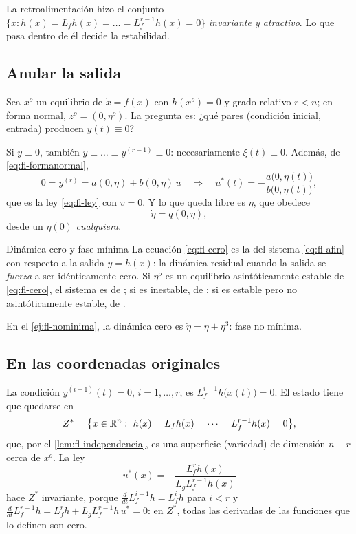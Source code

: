 
La retroalimentación hizo el conjunto $\{x:h(x)=L_fh(x)=\dots=L_f^{r-1}h(x)=0\}$ \emph{invariante y atractivo}. Lo que pasa dentro de él decide la estabilidad.

\subsection{Anular la salida}

Sea $x^o$ un equilibrio de $\dot x=f(x)$ con $h(x^o)=0$ y grado relativo $r<n$; en forma normal, $z^o=(0,\eta^o)$. La pregunta es: ¿qué pares (condición inicial, entrada) producen $y(t)\equiv0$?

Si $y\equiv0$, también $\dot y\equiv\dots\equiv y^{(r-1)}\equiv0$: necesariamente $\xi(t)\equiv0$. Además, de \eqref{eq:fl-formanormal},
\[
  0=y^{(r)}=a(0,\eta)+b(0,\eta)\,u
  \quad\Longrightarrow\quad
  u^*(t)=-\frac{a\bigl(0,\eta(t)\bigr)}{b\bigl(0,\eta(t)\bigr)} ,
\]
que es la ley \eqref{eq:fl-ley} con $v=0$. Y lo que queda libre es $\eta$, que obedece
\begin{equation}
  \dot\eta=q(0,\eta),
  \label{eq:fl-cero}
\end{equation}
desde un $\eta(0)$ \emph{cualquiera}.

\begin{definicion}[label=def:fl-cero]{Dinámica cero y fase mínima \citep{ByIs88}}
La ecuación \eqref{eq:fl-cero} es la  del sistema \eqref{eq:fl-afin} con respecto a la salida $y=h(x)$: la dinámica residual cuando la salida se \emph{fuerza} a ser idénticamente cero. Si $\eta^o$ es un equilibrio asintóticamente estable de \eqref{eq:fl-cero}, el sistema es de ; si es inestable, de ; si es estable pero no asintóticamente estable, de .
\end{definicion}

En el \cref{ej:fl-nominima}, la dinámica cero es $\dot\eta=\eta+\eta^3$: fase no mínima.

\subsection{En las coordenadas originales}

La condición $y^{(i-1)}(t)=0$, $i=1,\dots,r$, es $L_f^{i-1}h\bigl(x(t)\bigr)=0$. El estado tiene que quedarse en
\begin{equation}
  Z^*=\bigl\{x\in\R^n:\ h(x)=L_fh(x)=\dots=L_f^{r-1}h(x)=0\bigr\},
  \label{eq:fl-Zstar}
\end{equation}
que, por el \cref{lem:fl-independencia}, es una superficie (variedad) de dimensión $n-r$ cerca de $x^o$. La ley
\[
  u^*(x)=-\frac{L_f^rh(x)}{L_gL_f^{r-1}h(x)}
\]
hace $Z^*$ invariante, porque $\frac{d}{dt}L_f^{i-1}h=L_f^ih$ para $i<r$ y $\frac{d}{dt}L_f^{r-1}h=L_f^rh+L_gL_f^{r-1}h\,u^*=0$: en $Z^*$, todas las derivadas de las funciones que lo definen son cero.

